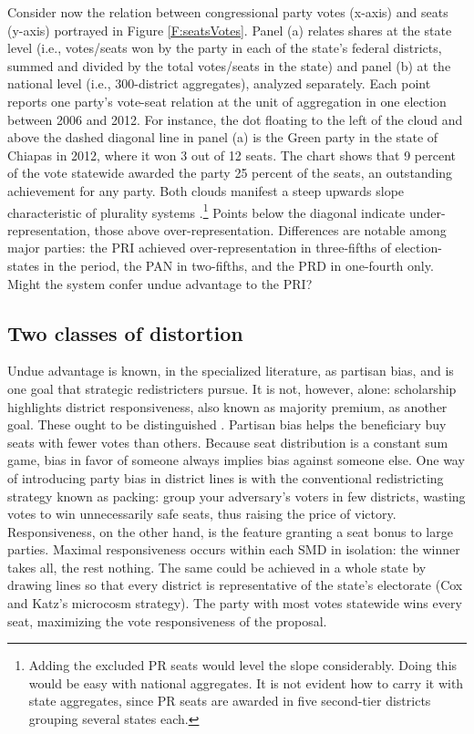 \documentclass[letter,12pt]{article}
\begin{document}
Consider now the relation between congressional party votes (x-axis) and seats (y-axis) portrayed in Figure \ref{F:seatsVotes}. Panel (a) relates shares at the state level (i.e., votes/seats won by the party in each of the state's federal districts, summed and divided by the total votes/seats in the state) and panel (b) at the national level (i.e., 300-district aggregates), analyzed separately. Each point reports one party's vote-seat relation at the unit of aggregation in one election between 2006 and 2012. For instance, the dot floating to the left of the cloud and above the dashed diagonal line in panel (a) is the Green party in the state of Chiapas in 2012, where it won 3 out of 12 seats. The chart shows that 9 percent of the vote statewide awarded the party 25 percent of the seats, an outstanding achievement for any party. Both clouds manifest a steep upwards slope characteristic of plurality systems \citep{taagepera.CubeLaw.1973}.\footnote{Adding the excluded PR seats would level the slope considerably. Doing this would be easy with national aggregates. It is not evident how to carry it with state aggregates, since PR seats are awarded in five second-tier districts grouping several states each.} Points below the diagonal indicate under-representation, those above over-representation. Differences are notable among major parties: the PRI achieved over-representation in three-fifths of election-states in the period, the PAN in two-fifths, and the PRD in one-fourth only. Might the system confer undue advantage to the PRI? %

\subsection{Two classes of distortion}

Undue advantage is known, in the specialized literature, as partisan bias, and is one goal that strategic redistricters pursue. It is not, however, alone: scholarship highlights district responsiveness, also known as majority premium, as another goal. These ought to be distinguished \citep[this paragraph draws heavily on][, ch.\ 3]{cox.katz.2002}. Partisan bias helps the beneficiary buy seats with fewer votes than others. Because seat distribution is a constant sum game, bias in favor of someone always implies bias against someone else. One way of introducing party bias in district lines is with the conventional redistricting strategy known as packing: group your adversary's voters in few districts, wasting votes to win unnecessarily safe seats, thus raising the price of victory. Responsiveness, on the other hand, is the feature granting a seat bonus to large parties. Maximal responsiveness occurs within each SMD in isolation: the winner takes all, the rest nothing. The same could be achieved in a whole state by drawing lines so that every district is representative of the state's electorate (Cox and Katz's microcosm strategy). The party with most votes statewide wins every seat, maximizing the vote responsiveness of the proposal. 
\end{document}
